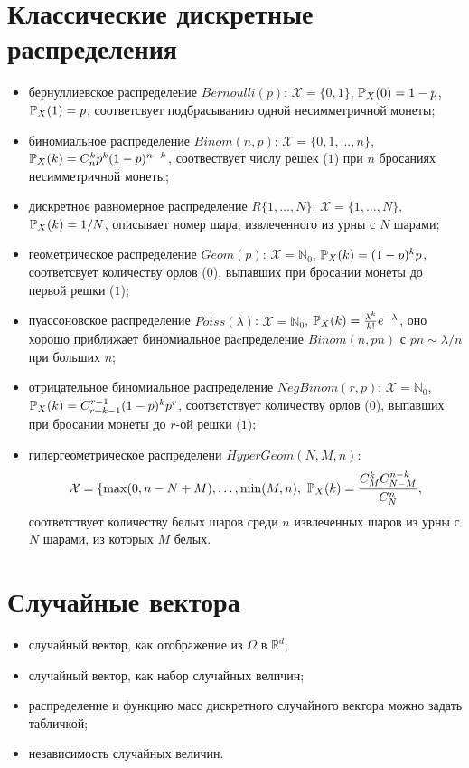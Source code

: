 \section*{Классические дискретные распределения}
\begin{itemize}
    \item
    бернуллиевское распределение $Bernoulli(p)$: $\mathcal{X} = \{0, 1\}$, $\operatorname{\mathbb{P}}_X(0) = 1 - p$, $\operatorname{\mathbb{P}}_X(1) = p$, соответсвует подбрасыванию одной несимметричной монеты;
    \item
    биномиальное распределение $Binom(n, p)$: $\mathcal{X} = \{0, 1, \ldots, n\}$, $\operatorname{\mathbb{P}}_X(k) = C_n^k p^k (1 - p)^{n - k}$, соотвествует числу решек ($1$) при $n$ бросаниях несимметричной монеты;
    \item
    дискретное равномерное распределение $R\{1, \ldots, N\}$: $\mathcal{X} = \{1, \ldots, N\}$, $\operatorname{\mathbb{P}}_X(k) = 1 / N$, описывает номер шара, извлеченного из урны с $N$ шарами;
    \item
    геометрическое распределение $Geom(p)$: $\mathcal{X} = \mathbb{N}_0$, $\operatorname{\mathbb{P}}_X(k) = (1 - p)^k p$, соответсвует количеству орлов ($0$), выпавших при бросании монеты до первой решки ($1$);
    \item
    пуассоновское распределение $Poiss(\lambda)$: $\mathcal{X} = \mathbb{N}_0$, $\operatorname{\mathbb{P}}_X(k) = \frac{\lambda^k}{k!} e^{-\lambda}$, оно хорошо приближает биномиальное раcпределение $Binom(n, pn)$ с $p n \sim \lambda / n$ при больших $n$;
    \item
    отрицательное биномиальное распределение $NegBinom(r, p)$:  $\mathcal{X} = \mathbb{N}_0$, $\operatorname{\mathbb{P}}_X(k) = C_{r + k - 1}^{r - 1} (1 - p)^k p^r$, соответствует количеству орлов ($0$), выпавших при бросании монеты до $r$-ой решки ($1$);
    \item
    гипергеометрическое распределени $HyperGeom(N, M, n)$: 
    \[
        \mathcal{X} = \{\max(0, n - N + M), \ldots, \min(M, n),\ \operatorname{\mathbb{P}}_X(k) = \frac{C_M^k C_{N - M}^{n - k}}{C_N^n}, 
    \]
    соответствует количеству белых шаров среди $n$ извлеченных шаров из урны с $N$ шарами, из которых $M$ белых.
\end{itemize}

\section*{Случайные вектора}
\begin{itemize}
    \item
    случайный вектор, как отображение из $\Omega$ в $\mathbb{R}^d$;
    \item
    случайный вектор, как набор случайных величин;
    \item
    распределение и функцию масс дискретного случайного вектора можно задать табличкой;
    \item
    независимость случайных величин.
\end{itemize}

